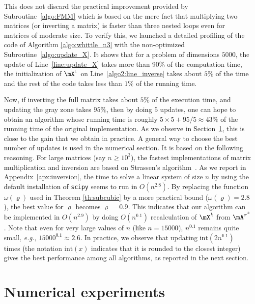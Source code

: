 This does not discard the practical improvement provided by Subroutine~\ref{algo:FMM} which is based on the mere fact that multiplying  two matrices (or inverting a matrix) is faster than three nested loops even for matrices of moderate size. To verify this, we launched  a detailed profiling of the code of Algorithm \ref{algo:whittle_n3} with the non-optimized Subroutine~\ref{algo:update_X}. It shows that for a problem of dimensions $5000$, the update of Line~\ref{line:update_X} takes more than 90\% of the computation time, the initialization of $\mX^1$ on Line~\ref{algo2:line_inverse} takes about $5\%$ of the time and the rest of the code takes less than $1\%$ of the running time.

Now, if inverting the full matrix takes about $5\%$ of the execution time, and updating the gray zone takes $95\%$, then by doing $5$ updates, one can hope to obtain an algorithm whose running time is roughly $5\times5 + 95/5\approx43\%$ of the running time of the original implementation. As we observe in Section~\ref{sec:numerical}, this is close to the gain that we obtain in practice. A general way to choose the best number of updates is used in the numerical section. It is based on the following reasoning. For large matrices (say $n\ge 10^3$), the fastest implementations of matrix multiplication and inversion are based on Strassen's algorithm~\cite{huang2016strassen,huang2018practical}. As we report in Appendix~\ref{apx:inversion}, the time to solve a linear system of size $n$ by using the default installation of \texttt{scipy} seems to run in $O(n^{2.8})$. By replacing the function $\omega(\varrho)$ used in Theorem \ref{th:subcubic} by a more practical bound ($\omega(\varrho)=2.8$), the best value for $\varrho$ becomes $\varrho = 0.9$. This indicates that our algorithm can be implemented in $O(n^{2.9})$ by doing $O(n^{0.1})$ recalculation of $\mX^k$ from $\mA^{\pi^k}$. Note that even for very large values of $n$ (like $n=15000$), $n^{0.1}$ remains quite small, \emph{e.g.}, $15000^{0.1}\approx 2.6$. In practice, we observe that updating $\mathrm{int}(2n^{0.1})$ times (the notation $\mathrm{int}(x)$ indicates that it is rounded to the closest integer) gives the best performance among all algorithms, as reported in the next section.



\section{Numerical experiments}
\label{sec:numerical}

